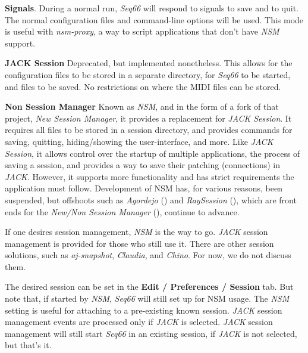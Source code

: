    \begin{enumber}
      \item \textbf{Signals}.
         During a normal run, \textsl{Seq66} will respond
         to signals to save and to quit.
         The normal configuration files and command-line options will be used.
         This mode is useful with \textsl{nsm-proxy}, a way to script
         applications that don't have \textsl{NSM} support.
      \item \textbf{JACK Session}
         Deprecated, but implemented nonetheless.
         This allows for the configuration files to be stored in
         a separate directory, for \textsl{Seq66} to be started, and files to
         be saved.  No restrictions on where the MIDI files can be stored.
      \item \textbf{Non Session Manager}
         Known as \textsl{NSM}, and in the form of a fork of that project,
         \textsl{New Session Manager},
         it provides a replacement for \textsl{JACK Session}.
         It requires all files to be
         stored in a session directory, and provides commands for saving,
         quitting, hiding/showing the user-interface, and more.
         Like \textsl{JACK Session}, it allows control over the startup of
         multiple applications, the process of saving a session, and provides a
         way to save their patching (connections) in \textsl{JACK}.
         However, it supports more functionality and has
         strict requirements the application must follow.
         Development of NSM has, for various reasons, been suspended, but
         offshoots such as \textsl{Agordejo} (\cite{agordejo})
         and \textsl{RaySession} (\cite{raysession}), which are front ends for
         the \textsl{New/Non Session Manager} (\cite{nsm}),
         continue to advance.
   \end{enumber}

   If one desires session management, \textsl{NSM} is the way to go.
   \textsl{JACK} session management is provided for those who still use it.
   There are other session solutions, such as \textsl{aj-snapshot},
   \textsl{Claudia}, and \textsl{Chino}.
   For now, we do not discuss them.

   The desired session can be set in the \textbf{Edit / Preferences /
   Session} tab.  But note that, if started by \textsl{NSM}, \textsl{Seq66}
   will still set up for NSM usage.  The \textsl{NSM} setting is
   useful for attaching to a pre-existing known session.
   \textsl{JACK} session management events are processed
   only if \textsl{JACK} is selected.
   \textsl{JACK} session management will still start \textsl{Seq66} in
   an existing session, if \textsl{JACK} is
   not selected, but that's it.

